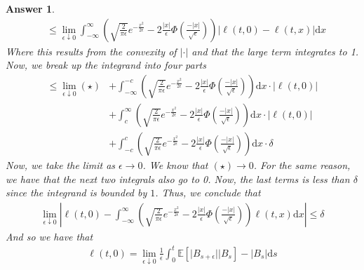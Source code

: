 \documentclass[12pt]{article}
\theoremstyle{colon}
\newtheorem*{answer}{Answer}
\begin{document}
\begin{answer}
\begin{align*}
    &\leq \lim_{\epsilon \downarrow 0} \int_{-\infty}^\infty \left(\sqrt{\frac{2}{\pi \epsilon}} e^{-\frac{x^2}{2 \epsilon}}  - 2 \frac{\lvert x \rvert}{\epsilon} \Phi\left(\frac{-\lvert x \rvert }{\sqrt{\epsilon}}\right) \right) \lvert \ell(t,0) - \ell(t,x) \rvert \text{d}x
  \end{align*}
  Where this results from the convexity of $\lvert \cdot \rvert$ and that the large term integrates to 1. Now, we break up the integrand into four parts
  \begin{align*}
    \leq \lim_{\epsilon \downarrow 0} (\star) &+ \int_{-\infty}^{-c} \left(\sqrt{\frac{2}{\pi \epsilon}} e^{-\frac{x^2}{2 \epsilon}}  - 2 \frac{\lvert x \rvert}{\epsilon} \Phi\left(\frac{-\lvert x \rvert }{\sqrt{\epsilon}}\right) \right) \text{d} x \cdot \lvert \ell(t,0) \rvert \\
    &+ \int_c^\infty \left(\sqrt{\frac{2}{\pi \epsilon}} e^{-\frac{x^2}{2 \epsilon}}  - 2 \frac{\lvert x \rvert}{\epsilon} \Phi\left(\frac{-\lvert x \rvert }{\sqrt{\epsilon}}\right) \right) \text{d} x \cdot \lvert \ell(t,0) \rvert \\
    &+ \int_{-c}^c \left(\sqrt{\frac{2}{\pi \epsilon}} e^{-\frac{x^2}{2 \epsilon}}  - 2 \frac{\lvert x \rvert}{\epsilon} \Phi\left(\frac{-\lvert x \rvert }{\sqrt{\epsilon}}\right) \right) \text{d} x \cdot \delta
  \end{align*}
  Now, we take the limit as $\epsilon \rightarrow 0$. We know that $(\star) \rightarrow 0$. For the same reason, we have that the next two integrals also go to 0. Now, the last terms is less than $\delta$ since the integrand is bounded by $1$. Thus, we conclude that
  \begin{gather*}
    \lim_{\epsilon \downarrow 0} \left\lvert \ell(t,0) - \int_{-\infty}^\infty \left(\sqrt{\frac{2}{\pi \epsilon}} e^{-\frac{x^2}{2 \epsilon}}  - 2 \frac{\lvert x \rvert}{\epsilon} \Phi\left(\frac{-\lvert x \rvert }{\sqrt{\epsilon}}\right) \right) \ell(t,x) \text{d}x \right\rvert \leq \delta
  \end{gather*}
  And so we have that
  \begin{gather*}
    \ell(t,0) = \lim_{\epsilon \downarrow 0} \frac{1}{\epsilon} \int_0^t  \mathbb{E}[\lvert B_{s+\epsilon} \rvert | B_s ] - \lvert B_s \rvert \text{d}s
  \end{gather*}
\end{answer}

\clearpage
\end{document}
